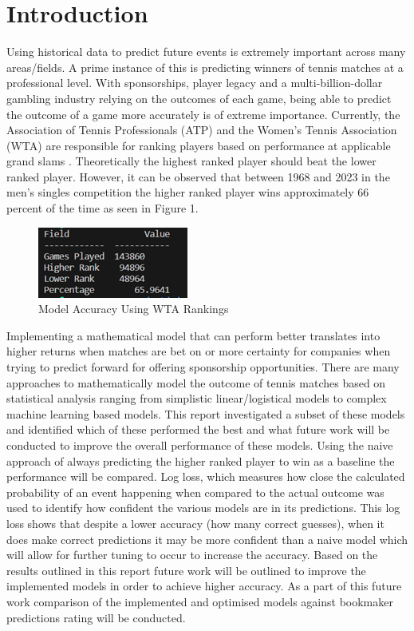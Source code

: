 \documentclass[12pt,a4paper]{article}
\begin{document}
\vspace{10mm}
\noindent \hrulefill

\clearpage
\section{Introduction}

Using historical data to predict future events is extremely important across many
areas/fields. A prime instance of this is predicting winners of tennis matches at
a professional level. With sponsorships, player legacy and a multi-billion-dollar
gambling industry relying on the outcomes of each game, being able to predict the
outcome of a game more accurately is of extreme importance. Currently, the
Association of Tennis Professionals (ATP) and the Women's Tennis Association
(WTA) are responsible for ranking players based on performance at applicable
grand slams \cite{nag_tennis_2022}.  Theoretically the highest ranked player should beat
the lower ranked player. However, it can be observed that between 1968 and 2023
in the men's singles competition the higher ranked player wins approximately 66
percent of the time as seen in Figure 1.

\begin{figure}[h!]
  \centering
  \includegraphics[scale=1.5]{images/tennis_rank_base.png}
  \caption{Model Accuracy Using WTA Rankings}
  \label{fig:ranking1}
\end{figure}

Implementing a mathematical model that can perform better translates into higher
returns when matches are bet on or more certainty for companies when trying to
predict forward for offering sponsorship opportunities. There are many approaches
to mathematically model the outcome of tennis matches based on statistical analysis
ranging from simplistic linear/logistical models to complex machine learning
based models. This report investigated a subset of these models and identified
which of these performed the best and what future work will be conducted to
improve the overall performance of these models. Using the naive approach of
always predicting the higher ranked player to win as a baseline the performance
will be compared. Log loss, which measures how close the calculated probability
of an event happening when compared to the actual outcome was used to identify
how confident the various models are in its predictions. This log loss shows that despite
a lower accuracy (how many correct guesses), when it does make correct
predictions it may be more confident than a naive model which will allow for
further tuning to occur to increase the accuracy.
\newline
Based on the results outlined in this report future work will be outlined to
improve the implemented models in order to achieve higher accuracy. As a part
of this future work comparison of the implemented and optimised models against
bookmaker predictions rating will be conducted.
\end{document}
